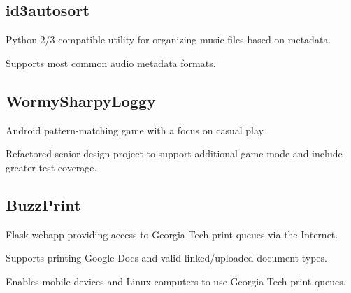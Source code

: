 \documentclass[]{deedy-resume-openfont}
\begin{document}
\begin{minipage}[t]{0.64\textwidth}
\subsection{id3autosort}
\vspace{\topsep} %
\begin{tightemize}
\item Python 2/3-compatible utility for organizing music files based on metadata.
\item Supports most common audio metadata formats.
\end{tightemize}
\sectionsep

\subsection{WormySharpyLoggy}
\vspace{\topsep} %
\begin{tightemize}
\item Android pattern-matching game with a focus on casual play.
\item Refactored senior design project to support additional game mode and include greater test coverage.
\end{tightemize}
\sectionsep

\subsection{BuzzPrint}
\vspace{\topsep} %
\begin{tightemize}
\item Flask webapp providing access to Georgia Tech print queues via the Internet.
\item Supports printing Google Docs and valid linked/uploaded document types.
\item Enables mobile devices and Linux computers to use Georgia Tech print queues.
\end{tightemize}
\sectionsep

\end{minipage}
\end{document}
